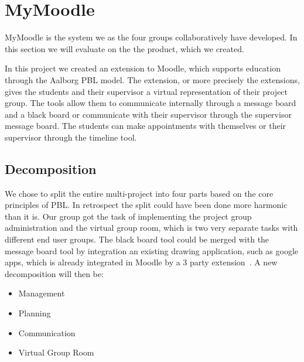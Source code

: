 \section{MyMoodle}
MyMoodle is the system we as the four groups collaboratively have developed.
In this section we will evaluate on the the product, which we created.


In this project we created an extension to Moodle, which supports education through the Aalborg PBL model. 
The extension, or more precisely the extensions, gives the students and their supervisor a virtual representation of their project group. 
The tools allow them to communicate internally through a message board and a black board or communicate with their supervisor through the supervisor message board.
The students can make appointments with themselves or  their supervisor through the timeline tool.


\subsection{Decomposition}
We chose to split the entire multi-project into four parts based on the core principles of PBL. 
In retrospect the split could have been done more harmonic than it is.
Our group got the task of implementing the project group administration and the virtual group room, which is two very separate tasks with different end user groups. 
The black board tool could be merged with the message board tool by integration an existing drawing application, such as google apps, which is already integrated in Moodle by a 3\rds{} party extension~\cite{moodlegoogleapp}. 
A new decomposition will then be:
\begin{itemize}
	\item Management
	\item Planning
	\item Communication
	\item Virtual Group Room
\end{itemize}


